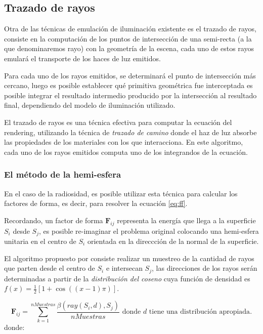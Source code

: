 \subsection{Trazado de rayos}
\label{sec:raytracing}

Otra de las técnicas de emulación de iluminación existente es el trazado de rayos, consiste en la computación de los puntos de intersección de una semi-recta (a la que denominaremos rayo) con la geometría de la escena, cada uno de estos rayos emulará el transporte de los haces de luz emitidos.

Para cada uno de los rayos emitidos, se determinará el punto de intersección más cercano, luego es posible establecer qué primitiva geométrica fue interceptada es posible integrar el resultado intermedio producido por la intersección al resultado final, dependiendo del modelo de iluminación utilizado.

El trazado de rayos es una técnica efectiva \cite{Kajiya} para computar la ecuación del rendering, utilizando la técnica de \textit{trazado de camino} donde el haz de luz absorbe las propiedades de los materiales con los que interacciona. En este algoritmo, cada uno de los rayos emitidos computa uno de los integrandos de la ecuación.

\subsubsection{El método de la hemi-esfera}

En el caso de la radiosidad, es posible utilizar esta técnica para calcular los factores de forma, es decir, para resolver la ecuación \eqref{eq:ff}.

Recordando, un factor de forma $\mathbf{F}_{ij}$ representa la energía que llega a la superficie $S_{i}$ desde $S_{j}$, es posible re-imaginar el problema original colocando una hemi-esfera unitaria en el centro de $S_{i}$ orientada en la direccción de la normal de la superficie.

El algoritmo propuesto por \citeauthor{Malley}  consiste realizar un muestreo de la cantidad de  rayos que parten desde el centro de $S_{i}$ e intersecan $S_{j}$, las direcciones de los rayos serán determinadas a partir de la \textit{distribución del coseno} cuya función de densidad es $f(x) = \frac{1}{2}[1 + \cos((x-1)\pi)]$.

\begin{equation}
	\mathbf{F}_{ij} = \sum_{k=1}^{nMuestras} \frac{\beta(ray(S_{i},d), S_{j})}{nMuestras} \text{ donde } d \text{ tiene una distribución apropiada}.
	\label{eq:ffhemiesfera}
\end{equation}
donde:

